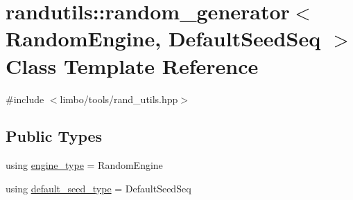 \hypertarget{classrandutils_1_1random__generator}{}\section{randutils\+:\+:random\+\_\+generator$<$ Random\+Engine, Default\+Seed\+Seq $>$ Class Template Reference}
\label{classrandutils_1_1random__generator}


{\ttfamily \#include $<$limbo/tools/rand\+\_\+utils.\+hpp$>$}

\subsection*{Public Types}
\begin{DoxyCompactItemize}
\item 
using \hyperlink{classrandutils_1_1random__generator_a7ccbb95be67d7cd19f4b128be21b4ac3}{engine\+\_\+type} = Random\+Engine
\item 
using \hyperlink{classrandutils_1_1random__generator_a424b01b5232f91d42163369ad6bd3b11}{default\+\_\+seed\+\_\+type} = Default\+Seed\+Seq
\end{DoxyCompactItemize}

